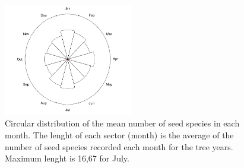 \documentclass[A4]{article}
\begin{document}
\begin{figure}[h!]
  \centering
  \includegraphics[width=0.5\textwidth]{../figures/circular_distribution}
  \caption{Circular distribution of the mean number of seed species in
    each month. The lenght of each sector (month) is the average of
    the number of seed species recorded each month for the tree
    years. Maximum lenght is 16,67 for July. }
  \label{fig:circular}
\end{figure}

\FloatBarrier



\end{document}
